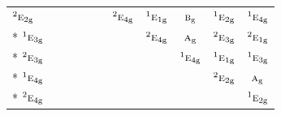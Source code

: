 \documentclass[10pt,a4paper]{article}
\numberwithin{equation}{section}
\newcommand{\irr}[1]{\text{\normalfont\scshape #1}}
\newcommand{\conjpair}[1]{{}^{#1}}
\newcommand{\ptag}[1]{\mathrm{#1}}
\begin{document}
{\begin{longtable}{@{}lcccccccccc@{}}
$\conjpair{2}\irr{e}_{2\ptag{g}}$ &  &  &  &  &  & $\conjpair{2}\irr{e}_{4\ptag{g}}$ & $\conjpair{1}\irr{e}_{1\ptag{g}}$ & $\irr{b}_{\ptag{g}}$ & $\conjpair{1}\irr{e}_{2\ptag{g}}$ & $\conjpair{1}\irr{e}_{4\ptag{g}}$\\*
$\conjpair{1}\irr{e}_{3\ptag{g}}$ &  &  &  &  &  &  & $\conjpair{2}\irr{e}_{4\ptag{g}}$ & $\irr{a}_{\ptag{g}}$ & $\conjpair{2}\irr{e}_{3\ptag{g}}$ & $\conjpair{2}\irr{e}_{1\ptag{g}}$\\*
$\conjpair{2}\irr{e}_{3\ptag{g}}$ &  &  &  &  &  &  &  & $\conjpair{1}\irr{e}_{4\ptag{g}}$ & $\conjpair{1}\irr{e}_{1\ptag{g}}$ & $\conjpair{1}\irr{e}_{3\ptag{g}}$\\*
$\conjpair{1}\irr{e}_{4\ptag{g}}$ &  &  &  &  &  &  &  &  & $\conjpair{2}\irr{e}_{2\ptag{g}}$ & $\irr{a}_{\ptag{g}}$\\*
$\conjpair{2}\irr{e}_{4\ptag{g}}$ &  &  &  &  &  &  &  &  &  & $\conjpair{1}\irr{e}_{2\ptag{g}}$\\
\bottomrule\end{longtable}}
\end{document}
